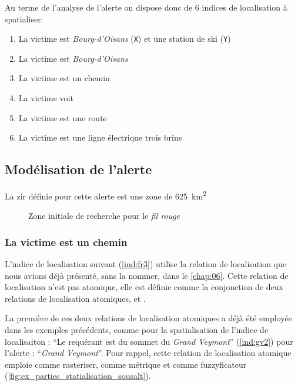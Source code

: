 Au terme de l'analyse de l'alerte on dispose donc de 6 indices de
localisation à spatialiser:
% 
\begin{enumerate}
\item \label{ind:fr1} La victime est
  \emph{Bourg-d'Oisans} (\texttt{X}) et une station de ski
  (\texttt{Y})
\item \label{ind:fr2} La victime est
   \emph{Bourg-d'Oisans} 
\item \label{ind:fr3} La victime est  un
  chemin
\item \label{ind:fr4} La victime voit
\item \label{ind:fr5} La victime est  une
  route
\item \label{ind:fr6} La victime est  une
  ligne électrique trois brins
\end{enumerate}

\subsection{Modélisation de l'alerte}
\label{subsec:9-4-2}

La \ac{zir} définie pour cette alerte est une zone de
\SI{625}{\kilo\meter\squared}

\begin{figure}
  \centering
  
  \caption{Zone initiale de recherche pour le \emph{fil rouge}}
  \label{fig:zir_fil_rouge}
\end{figure}

\subsubsection{La victime est \protect{} un chemin}

L'indice de localisation suivant (\ref{ind:fr3}) utilise la relation
de localisation  que nous avions déjà
présenté, sans la nommer, dans le \autoref{chap:06}. Cette relation de
localisation n'est pas atomique, elle est définie comme la conjonction
de deux relations de localisation atomiques,
 et .

La première de ces deux relations de localisation atomiques
 a déjà été employée dans les exemples
précédents, comme pour la spatialisation de l'indice de localisaiton :
\enquote{Le requérant est  du sommet du
  \emph{Grand Veymont}} (\ref{ind:gv2}) pour l'alerte :
\enquote{\emph{Grand Veymont}}. Pour rappel, cette relation de
localisation atomique emploie  comme rasteriser,
 comme métrique et
 comme fuzzyficateur
(\autoref{fig:ex_parties_statialisation_sousalt}).

